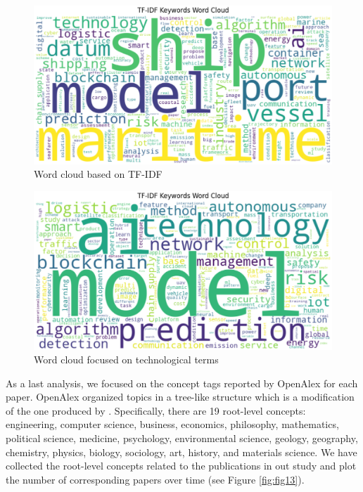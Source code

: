 \documentclass[a4paper, review, endfloat, authoryear]{elsarticle}
\begin{document}
	\begin{figure}[htbp]
		\centering
		\includegraphics[width=\linewidth]{pics/wordcloud_1.eps}
		\caption{Word cloud based on TF-IDF}\label{fig:fig11}
	\end{figure}
	
	\begin{figure}[htbp]
		\centering
		\includegraphics[width=\linewidth]{pics/wordcloud_2.eps}
		\caption{Word cloud focused on technological terms}\label{fig:fig12}
	\end{figure}
	
	As a last analysis, we focused on the concept tags reported by OpenAlex for each paper. OpenAlex organized topics in a tree-like structure which is a modification of the one produced by \citep{shen2018web}. Specifically, there are 19 root-level concepts: engineering, computer science, business, economics, philosophy, mathematics, political science, medicine, psychology, environmental science, geology, geography, chemistry, physics, biology, sociology, art, history, and materials science. We have collected the root-level concepts related to the publications in out study and plot the number of corresponding papers over time (see Figure \ref{fig:fig13}).
	
\end{document}

